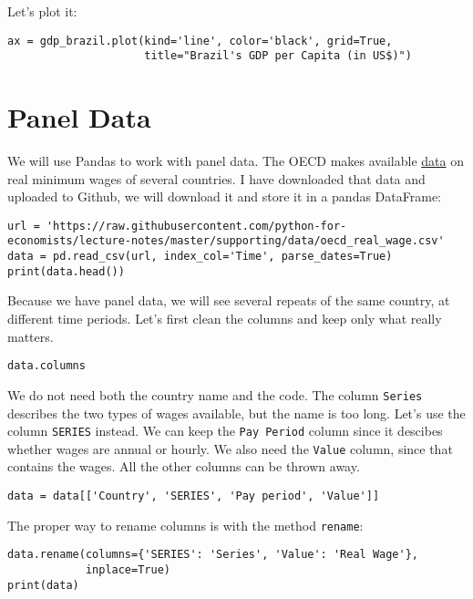\documentclass[12pt, a4paper]{article}
\begin{document}
Let's plot it:
\lstset{language=jupyter-python,label= ,caption= ,captionpos=b,numbers=none}
\begin{lstlisting}
ax = gdp_brazil.plot(kind='line', color='black', grid=True,
                     title="Brazil's GDP per Capita (in US$)")
\end{lstlisting}
\section{Panel Data}
\label{sec:org78baea6}
We will use Pandas to work with panel data.
The OECD makes available \href{https://stats.oecd.org/Index.aspx?DataSetCode=RMW}{data} on real minimum wages of several countries.
I have downloaded that data and uploaded to Github, we will download it and store it in a pandas DataFrame:
\lstset{language=jupyter-python,label= ,caption= ,captionpos=b,numbers=none}
\begin{lstlisting}
url = 'https://raw.githubusercontent.com/python-for-economists/lecture-notes/master/supporting/data/oecd_real_wage.csv'
data = pd.read_csv(url, index_col='Time', parse_dates=True)
print(data.head())
\end{lstlisting}

Because we have panel data, we will see several repeats of the same country, at different time periods.
Let's first clean the columns and keep only what really matters.
\lstset{language=jupyter-python,label= ,caption= ,captionpos=b,numbers=none}
\begin{lstlisting}
data.columns
\end{lstlisting}
We do not need both the country name and the code.
The column \texttt{Series} describes the two types of wages available, but the name is too long.
Let's use the column \texttt{SERIES} instead.
We can keep the \texttt{Pay Period} column since it descibes whether wages are annual or hourly.
We also need the \texttt{Value} column, since that contains the wages.
All the other columns can be thrown away.
\lstset{language=jupyter-python,label= ,caption= ,captionpos=b,numbers=none}
\begin{lstlisting}
data = data[['Country', 'SERIES', 'Pay period', 'Value']]
\end{lstlisting}

The proper way to rename columns is with the method \texttt{rename}:
\lstset{language=jupyter-python,label= ,caption= ,captionpos=b,numbers=none}
\begin{lstlisting}
data.rename(columns={'SERIES': 'Series', 'Value': 'Real Wage'},
            inplace=True)
print(data)
\end{lstlisting}
\end{document}
